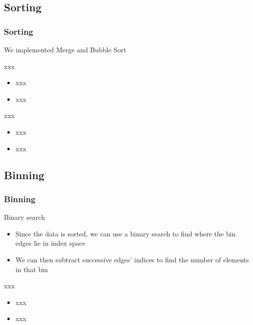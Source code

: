 \documentclass{beamer}
\begin{document}
\subsection{Sorting}

\begin{frame}	
	\frametitle{Sorting}
	
	We implemented Merge and Bubble Sort
	
	\begin{block}{xxx}
		\begin{itemize}
			\item xxx
			\item xxx
		\end{itemize}
	\end{block}
	
	\begin{block}{xxx}
		\begin{itemize}
			\item xxx
			\item xxx
		\end{itemize}
	\end{block}
\end{frame}

\subsection{Binning}

\begin{frame}	
	\frametitle{Binning}
	
	\begin{block}{Binary search}
		\begin{itemize}
			\item Since the data is sorted, we can use a binary search to find where the bin edges lie in index space
			\item We can then subtract successive edges' indices to find the number of elements in that bin
		\end{itemize}
	\end{block}
	
	\begin{block}{xxx}
		\begin{itemize}
			\item xxx
			\item xxx
		\end{itemize}
	\end{block}
\end{frame}
\end{document}
